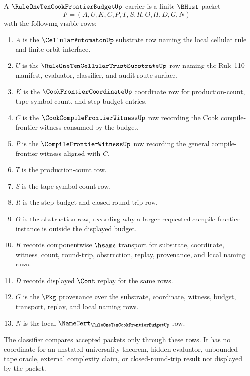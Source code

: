 \begin{definition}
\label{def:rule110-cook-frontier-budget-carrier}
A $\RuleOneTenCookFrontierBudgetUp$ carrier is a finite $\BHist$ packet
$$
F=(A,U,K,C,P,T,S,R,O,H,D,G,N)
$$
with the following visible rows:
\begin{enumerate}
\item $A$ is the $\CellularAutomatonUp$ substrate row naming the local cellular rule and finite orbit interface.
\item $U$ is the $\RuleOneTenCellularTrustSubstrateUp$ row naming the Rule 110 manifest, evaluator, classifier, and audit-route surface.
\item $K$ is the $\CookFrontierCoordinateUp$ coordinate row for production-count, tape-symbol-count, and step-budget entries.
\item $C$ is the $\CookCompileFrontierWitnessUp$ row recording the Cook compile-frontier witness consumed by the budget.
\item $P$ is the $\CompileFrontierWitnessUp$ row recording the general compile-frontier witness aligned with $C$.
\item $T$ is the production-count row.
\item $S$ is the tape-symbol-count row.
\item $R$ is the step-budget and closed-round-trip row.
\item $O$ is the obstruction row, recording why a larger requested compile-frontier instance is outside the displayed budget.
\item $H$ records componentwise $\hsame$ transport for substrate, coordinate, witness, count, round-trip, obstruction, replay, provenance, and local naming rows.
\item $D$ records displayed $\Cont$ replay for the same rows.
\item $G$ is the $\Pkg$ provenance over the substrate, coordinate, witness, budget, transport, replay, and local naming rows.
\item $N$ is the local $\NameCert_{\RuleOneTenCookFrontierBudgetUp}$ row.
\end{enumerate}
The classifier compares accepted packets only through these rows. It has no coordinate for an unstated universality theorem, hidden evaluator, unbounded tape oracle, external complexity claim, or closed-round-trip result not displayed by the packet.
\end{definition}


